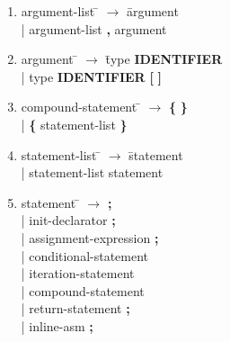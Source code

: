 \begin{enumerate}
\item \begin{tabbing} argument-list \= $\rightarrow$ \= argument \\
	\> \hspace*{0.05cm} | \> argument-list \textbf{,} argument
\end{tabbing}

\item \begin{tabbing} argument \= $\rightarrow$ \= type \textbf{IDENTIFIER} \\
	\> \hspace*{0.05cm} | \> type \textbf{IDENTIFIER} \textbf{[} \textbf{]} \\
\end{tabbing}

\item \begin{tabbing} compound-statement \= $\rightarrow$ \= \textbf{\{} \textbf{\}} \\
	\> \hspace*{0.05cm} | \> \textbf{\{} statement-list \textbf{\}} \\
\end{tabbing}

\item \begin{tabbing} statement-list \= $\rightarrow$ \= statement \\
	\> \hspace*{0.05cm} | \> statement-list statement
\end{tabbing}

\item \begin{tabbing} statement \= $\rightarrow$ \= \textbf{;} \\
	\> \hspace*{0.05cm} | \> init-declarator \textbf{;} \\
	\> \hspace*{0.05cm} | \> assignment-expression \textbf{;} \\
	\> \hspace*{0.05cm} | \> conditional-statement \\
	\> \hspace*{0.05cm} | \> iteration-statement \\
	\> \hspace*{0.05cm} | \> compound-statement \\
	\> \hspace*{0.05cm} | \> return-statement \textbf{;} \\
	\> \hspace*{0.05cm} | \> inline-asm \textbf{;} \\
\end{tabbing}


\end{enumerate}
